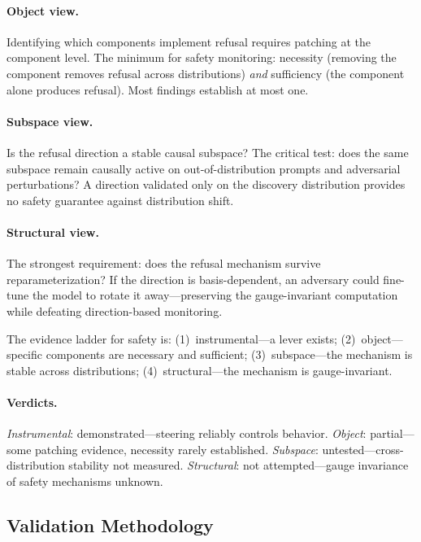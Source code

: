 \documentclass{article}
\begin{document}
\paragraph{Object view.}
Identifying which components implement refusal requires patching at the
component level. The minimum for safety monitoring: necessity (removing
the component removes refusal across distributions) \emph{and}
sufficiency (the component alone produces refusal). Most findings
establish at most one.

\paragraph{Subspace view.}
Is the refusal direction a stable causal subspace? The critical test:
does the same subspace remain causally active on out-of-distribution
prompts and adversarial perturbations? A direction validated only on the
discovery distribution provides no safety guarantee against distribution
shift.

\paragraph{Structural view.}
The strongest requirement: does the refusal mechanism survive
reparameterization? If the direction is basis-dependent, an adversary
could fine-tune the model to rotate it away---preserving the
gauge-invariant computation while defeating direction-based monitoring.

The evidence ladder for safety is: (1)~instrumental---a lever exists;
(2)~object---specific components are necessary and sufficient;
(3)~subspace---the mechanism is stable across distributions;
(4)~structural---the mechanism is gauge-invariant.

\paragraph{Verdicts.}
\emph{Instrumental}: demonstrated---steering reliably controls behavior.
\emph{Object}: partial---some patching evidence, necessity rarely
established.
\emph{Subspace}: untested---cross-distribution stability not measured.
\emph{Structural}: not attempted---gauge invariance of safety mechanisms
unknown.



\subsection{Validation Methodology}\label{app:cs_validation}
\end{document}

